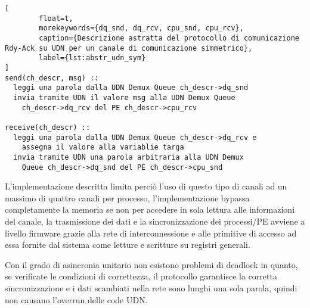 \begin{lstlisting}[
        float=t,
        morekeywords={dq_snd, dq_rcv, cpu_snd, cpu_rcv}, 
        caption={Descrizione astratta del protocollo di comunicazione Rdy-Ack su UDN per un canale di comunicazione simmetrico},
        label={lst:abstr_udn_sym}
]
send(ch_descr, msg) ::
  leggi una parola dalla UDN Demux Queue ch_descr->dq_snd
  invia tramite UDN il valore msg alla UDN Demux Queue 
    ch_descr->dq_rcv del PE ch_descr->cpu_rcv

receive(ch_descr) ::
  leggi una parola dalla UDN Demux Queue ch_descr->dq_rcv e
    assegna il valore alla variablie targa
  invia tramite UDN una parola arbitraria alla UDN Demux
    Queue ch_descr->dq_snd del PE ch_descr->cpu_snd
\end{lstlisting}

L'implementazione descritta limita perci\`o l'uso di questo tipo di canali ad un massimo di quattro canali per processo, l'implementazione bypassa completamente la memoria se non per accedere in sola lettura alle informazioni del canale, la trasmissione dei dati e la sincronizzazione dei processi/PE avviene a livello firmware grazie alla rete di interconnessione e alle primitive di accesso ad essa fornite dal sistema come letture e scritture su registri generali. 

Con il grado di asincronia unitario non esistono problemi di deadlock in quanto, se verificate le condizioni di correttezza, il protocollo garantisce la corretta sincronizzazione e i dati scambiati nella rete sono lunghi una sola parola, quindi non causano l'overrun delle code UDN.

\FloatBarrier
